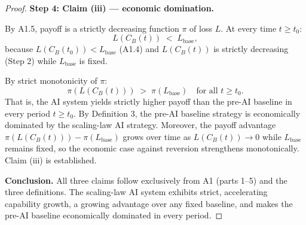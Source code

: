 \documentclass[12pt]{article}
\begin{document}
\begin{proof}
\medskip
\noindent\textbf{Step 4: Claim (iii) — economic domination.}

By A1.5, payoff is a strictly decreasing function $\pi$ of loss $L$.
At every time $t \geq t_0$:
\[
  L(C_B(t)) \;<\; L_{\mathrm{base}},
\]
because $L(C_B(t_0)) < L_{\mathrm{base}}$ (A1.4) and $L(C_B(t))$ is
strictly decreasing (Step 2) while $L_{\mathrm{base}}$ is fixed.

By strict monotonicity of $\pi$:
\[
  \pi\!\left(L(C_B(t))\right) \;>\; \pi\!\left(L_{\mathrm{base}}\right)
  \quad \text{for all } t \geq t_0.
\]
That is, the AI system yields strictly higher payoff than the pre-AI
baseline in every period $t \geq t_0$.  By Definition 3, the pre-AI
baseline strategy is economically dominated by the scaling-law AI strategy.
Moreover, the payoff advantage $\pi(L(C_B(t))) - \pi(L_{\mathrm{base}})$
grows over time as $L(C_B(t)) \to 0$ while $L_{\mathrm{base}}$ remains
fixed, so the economic case against reversion strengthens monotonically.
Claim (iii) is established.

\medskip
\noindent\textbf{Conclusion.}
All three claims follow exclusively from A1 (parts 1--5) and the three
definitions.  The scaling-law AI system exhibits strict, accelerating
capability growth, a growing advantage over any fixed baseline, and
makes the pre-AI baseline economically dominated in every period.
\end{proof}
\end{document}

